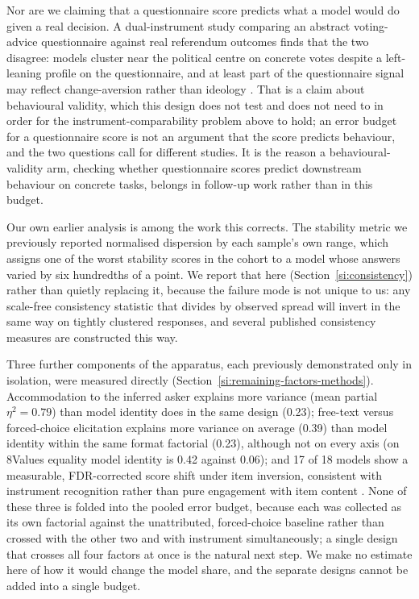 \documentclass[11pt]{article}
\begin{document}
Nor are we claiming that a questionnaire score predicts what a model would
do given a real decision. A dual-instrument study comparing an abstract
voting-advice questionnaire against real referendum outcomes finds that the
two disagree: models cluster near the political centre on concrete votes
despite a left-leaning profile on the questionnaire, and at least part of
the questionnaire signal may reflect change-aversion rather than ideology
\citep{barmettler2026instrument}. That is a claim about behavioural validity,
which this design does not test and does not need to in order for the
instrument-comparability problem above to hold; an error budget for a
questionnaire score is not an argument that the score predicts behaviour,
and the two questions call for different studies. It is the reason a
behavioural-validity arm, checking whether questionnaire scores predict
downstream behaviour on concrete tasks, belongs in follow-up work rather
than in this budget.

Our own earlier analysis is among the work this corrects. The stability
metric we previously reported normalised dispersion by each sample's own
range, which assigns one of the worst stability scores in the cohort to a
model whose answers varied by six hundredths of a point. We report that
here (Section~\ref{si:consistency}) rather than quietly replacing it,
because the failure mode is not unique to us: any scale-free consistency
statistic that divides by observed spread will invert in the same way on
tightly clustered responses, and several published consistency measures are
constructed this way.

Three further components of the apparatus, each previously demonstrated only in isolation, were measured directly (Section~\ref{si:remaining-factors-methods}). Accommodation to the inferred asker \citep{tornberg2026sycophancy} explains more variance (mean partial $\eta^2=0.79$) than model identity does in the same design (0.23); free-text versus forced-choice elicitation \citep{rottger2024} explains more variance on average (0.39) than model identity within the same format factorial (0.23), although not on every axis (on 8Values equality model identity is 0.42 against 0.06); and 17 of 18 models show a measurable,
FDR-corrected score shift under item inversion, consistent with instrument
recognition rather than pure engagement with item content
\citep{bianchi2026plasticity}. None of these three is folded into the
pooled error budget, because each was collected as its own factorial
against the unattributed, forced-choice baseline rather than crossed with
the other two and with instrument simultaneously; a single design that crosses all four factors at once is the natural next step. We make no estimate here of how it would change the model share, and the separate designs cannot be added into a single budget.
\end{document}
